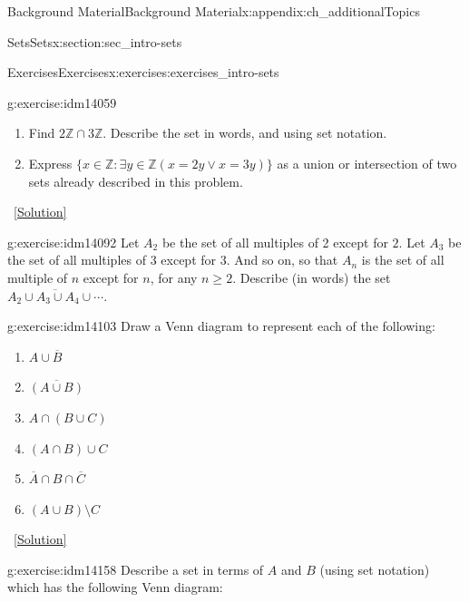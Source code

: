 \documentclass[oneside,10pt,]{book}
\numberwithin{equation}{chapter}
\def\Z{\mathbb Z}
\def\st{:}
\begin{document}
\begin{appendixptx}{Background Material}{}{Background Material}{}{}{x:appendix:ch_additionalTopics}
\begin{sectionptx}{Sets}{}{Sets}{}{}{x:section:sec_intro-sets}
\begin{exercises-subsection}{Exercises}{}{Exercises}{}{}{x:exercises:exercises_intro-sets}
\begin{divisionexercise}{5}{}{}{g:exercise:idm14059}
\begin{enumerate}[label=(\alph*)]
\item{}Find \(2\Z \cap 3\Z\). Describe the set in words, and using set notation.%
\item{}Express \(\{x \in \Z \st \exists y\in \Z (x = 2y \vee x = 3y)\}\) as a union or intersection of two sets already described in this problem.%
\end{enumerate}
%
\qquad~\hfill{\tiny\hyperlink{g:solution:idm14080-main}{[Solution]}}\end{divisionexercise}%
\begin{divisionexercise}{6}{}{}{g:exercise:idm14092}%
Let \(A_2\) be the set of all multiples of 2 except for \(2\). Let \(A_3\) be the set of all multiples of 3 except for 3. And so on, so that \(A_n\) is the set of all multiple of \(n\) except for \(n\), for any \(n \ge 2\). Describe (in words) the set \(\overline{A_2 \cup A_3 \cup A_4 \cup \cdots}\).%
\end{divisionexercise}%
\begin{divisionexercise}{7}{}{}{g:exercise:idm14103}%
Draw a Venn diagram to represent each of the following:%
\begin{enumerate}[label=(\alph*)]
\item{}\(A \cup \overline B\)%
\item{}\(\overline{(A \cup B)}\)%
\item{}\(A \cap (B \cup C)\)%
\item{}\((A \cap B) \cup C\)%
\item{}\(\overline A \cap B \cap \overline C\)%
\item{}\((A \cup B) \setminus C\)%
\end{enumerate}
%
\qquad~\hfill{\tiny\hyperlink{g:solution:idm14119-main}{[Solution]}}\end{divisionexercise}%
\begin{divisionexercise}{8}{}{}{g:exercise:idm14158}%
Describe a set in terms of \(A\) and \(B\) (using set notation) which has the following Venn diagram:%
\begin{sidebyside}{1}{0.4}{0.4}{0}%
\begin{sbspanel}{0.2}%
\end{sbspanel}
\end{sidebyside}
\end{divisionexercise}
\end{exercises-subsection}
\end{sectionptx}
\end{appendixptx}
\end{document}

